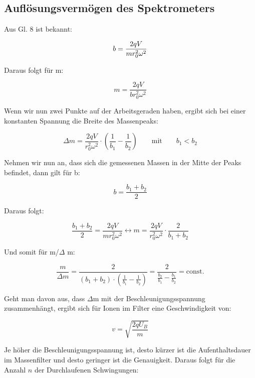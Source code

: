 \newpage
\subsection{Auflösungsvermögen des Spektrometers}
Aus Gl. 8 ist bekannt:

\begin{equation}
\notag
b = \frac{2qV}{mr_{0}^{2}\omega^{2}}
\end{equation}

Daraus folgt für m:

\begin{equation}
m = \frac{2qV}{br_{0}^{2}\omega^{2}}
\end{equation}

Wenn wir nun zwei Punkte auf der Arbeitsgeraden haben, ergibt sich bei einer konstanten Spannung die Breite des Massenpeaks:

\begin{equation}
\Delta m = \frac{2qV}{r_{0}^{2}\omega^{2}}\cdot \left( \frac{1}{b_1}-\frac{1}{b_2}\right) \qquad \text{mit} \qquad b_1 < b_2
\end{equation}

Nehmen wir nun an, dass sich die gemessenen Massen in der Mitte der Peaks befindet, dann gilt für b:

\begin{equation}
b = \frac{b_1 + b_2}{2}
\end{equation}

Daraus folgt:

\begin{equation}
\frac{b_1 + b_2}{2}=\frac{2qV}{mr_0^2 \omega^2} \leftrightarrow m = \frac{2qV}{r_0^2 \omega^2}\cdot \frac{2}{b_1 + b_2}
\end{equation}

Und somit für m/$\Delta$ m:

\begin{equation}
\frac{m}{\Delta m} = \frac{2}{(b_1+b_2)\cdot \left(\frac{1}{b_1}-\frac{1}{b_2}\right)} = \frac{2}{\frac{b_2}{b_1}-\frac{b_1}{b_2}} = \text{const.}
\end{equation}

Geht man davon aus, dass $\Delta$m mit der Beschleunigungsspannung zusammenhängt, ergibt sich für Ionen im Filter eine Geschwindigkeit von:

\begin{equation}
v=\sqrt{\frac{2qU_B}{m}}
\end{equation}

Je höher die Beschleunigungsspannung ist, desto kürzer ist die Aufenthaltsdauer im Massenfilter und desto geringer ist die Genauigkeit. Daraus folgt für die Anzahl $n$ der Durchlaufenen Schwingungen:

